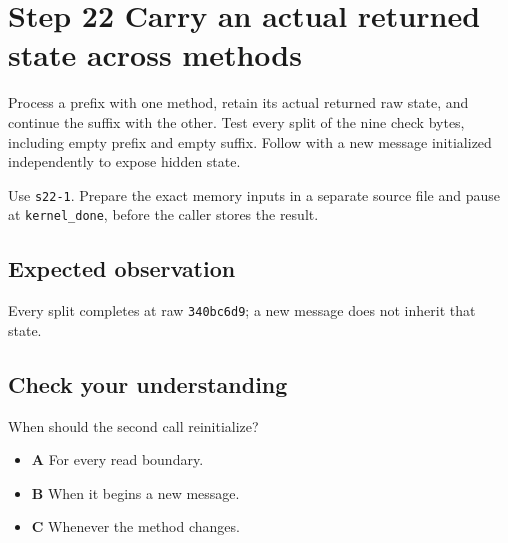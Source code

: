\section{Step 22 Carry an actual returned state across methods}\label{crc-s22}

Process a prefix with one method, retain its actual returned raw state, and continue the suffix with the other. Test every split of the nine check bytes, including empty prefix and empty suffix. Follow with a new message initialized independently to expose hidden state.

Use \texttt{s22-1}. Prepare the exact memory inputs in a separate source file and pause at \texttt{kernel\_done}, before the caller stores the result.

\subsection{Expected observation}
Every split completes at raw \texttt{340bc6d9}; a new message does not inherit that state.

\subsection{Check your understanding}
When should the second call reinitialize?

\begin{itemize}
  \item \textbf{A} For every read boundary.
  \item \textbf{B} When it begins a new message.
  \item \textbf{C} Whenever the method changes.
\end{itemize}
